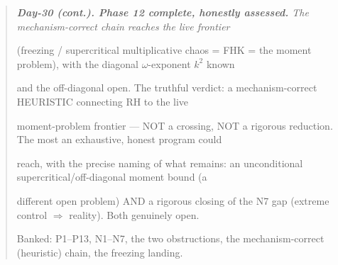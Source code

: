 \documentclass[10pt]{article}
\begin{document}
\begin{quote}\itshape
\textbf{Day-30 (cont.). Phase 12 complete, honestly assessed.} The mechanism-correct chain reaches the live frontier\par
(freezing / supercritical multiplicative chaos = FHK = the moment problem), with the diagonal \ensuremath{\omega}-exponent $k^2$ known\par
and the off-diagonal open. The truthful verdict: a mechanism-correct HEURISTIC connecting RH to the live\par
moment-problem frontier --- NOT a crossing, NOT a rigorous reduction. The most an exhaustive, honest program could\par
reach, with the precise naming of what remains: an unconditional supercritical/off-diagonal moment bound (a\par
different open problem) AND a rigorous closing of the N7 gap (extreme control \ensuremath{\Rightarrow} reality). Both genuinely open.\par
Banked: P1--P13, N1--N7, the two obstructions, the mechanism-correct (heuristic) chain, the freezing landing.\par
\end{quote}
\end{document}
